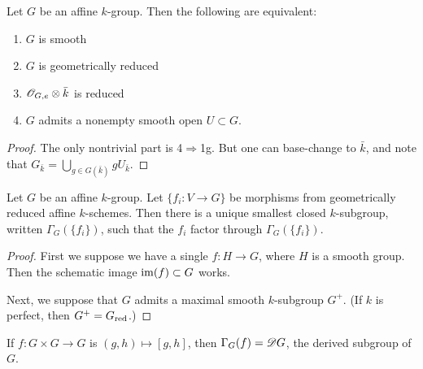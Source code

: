 \documentclass{article}
\begin{document}
\begin{lemma}
Let $G$ be an affine $k$-group. Then the following are equivalent: 
\begin{enumerate}
  \item $G$ is smooth 
  \item $G$ is geometrically reduced 
  \item $\mathscr{O}_{G,e}\otimes \bar k$ is reduced 
  \item $G$ admits a nonempty smooth open $U\subset G$. 
\end{enumerate}
\end{lemma}
\begin{proof}
The only nontrivial part is 4$\Rightarrow$1g. But one can base-change to 
$\bar k$, and note that $G_{\bar k}=\bigcup_{g\in G(\bar k)} g U_{\bar k}$. 
\end{proof}

\begin{proposition}
Let $G$ be an affine $k$-group. Let $\{f_i:V\to G\}$ be morphisms from 
geometrically reduced affine $k$-schemes. Then there is a unique smallest 
closed $k$-subgroup, written $\Gamma_G(\{f_i\})$, such that the $f_i$ 
factor through $\Gamma_G(\{f_i\})$. 
\end{proposition}
\begin{proof}
First we suppose we have a single $f:H\to G$, where $H$ is a smooth group. 
Then the schematic image $\operatorname{im}(f)\subset G$ works. 

Next, we suppose that $G$ admits a maximal smooth $k$-subgroup $G^+$. (If 
$k$ is perfect, then $G^+=G_{\mathrm{red}}$.) 
\end{proof}

If $f:G\times G\to G$ is 
$(g,h)\mapsto [g,h]$, then $\Gamma_G(f) = \mathscr{D} G$, the derived subgroup of 
$G$. 
\end{document}
